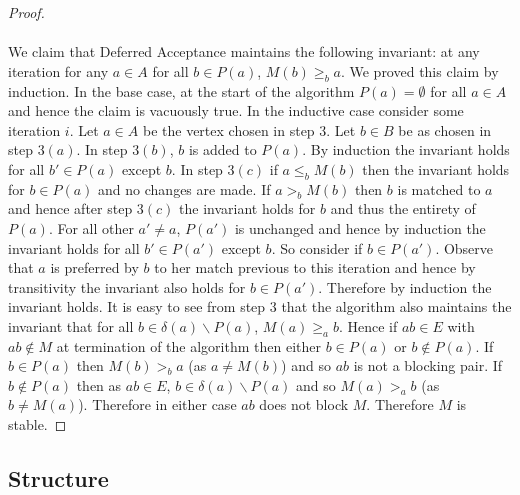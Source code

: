 \begin{proof}
\paragraph{}
We claim that Deferred Acceptance maintains the following invariant: at any iteration for any $a \in A$ for all $b \in P(a)$, $M(b) \geq_b a$. We proved this claim by induction. In the base case, at the start of the algorithm $P(a) = \emptyset$ for all $a \in A$ and hence the claim is vacuously true. In the inductive case consider some iteration $i$. Let $a\in A$ be the vertex chosen in step $3$. Let $b \in B$ be as chosen in step $3(a)$. In step $3(b)$, $b$ is added to $P(a)$. By induction the invariant holds for all $b' \in P(a)$ except $b$. In step $3(c)$ if $a \leq_b M(b)$ then the invariant holds for $b \in P(a)$ and no changes are made. If $a >_b M(b)$ then $b$ is matched to $a$ and hence after step $3(c)$ the invariant holds for $b$ and thus the entirety of $P(a)$. For all other $a' \neq a$, $P(a')$ is unchanged and hence by induction the invariant holds for all $b' \in P(a')$ except $b$. So consider if $b \in P(a')$. Observe that $a$ is preferred by $b$ to her match previous to this iteration and hence by transitivity the invariant also holds for $b \in P(a')$. Therefore by induction the invariant holds. It is easy to see from step $3$ that the algorithm also maintains the invariant that for all $b \in \delta(a)\backslash P(a)$, $M(a) \geq_a b$. Hence if $ab \in E$ with $ab \not\in M$ at termination of the algorithm then either $b \in P(a)$ or $b \not\in P(a)$. If $b \in P(a)$ then $M(b) >_b a$ (as $a \neq M(b)$) and so $ab$ is not a blocking pair. If $b \not\in P(a)$ then as $ab \in E$, $b \in \delta(a) \backslash P(a)$ and so $M(a) >_a b$ (as $b \neq M(a)$). Therefore in either case $ab$ does not block $M$. Therefore $M$ is stable.
\end{proof}
\subsection{Structure}\label{SM:STRUCTURE}
